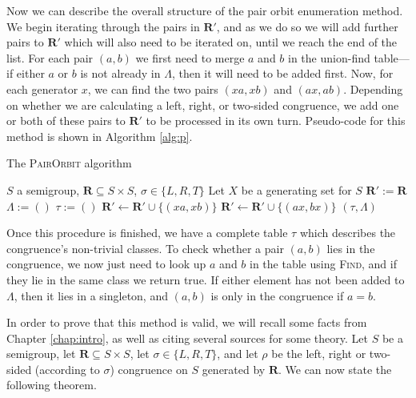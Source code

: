 Now we can describe the overall structure of the pair orbit enumeration method.
We begin iterating through the pairs in $\mathbf{R}'$, and as we do so we
will add further pairs to $\mathbf{R}'$ which will also need to be iterated on,
until we reach the end of the list.  For each pair $(a,b)$ we first need to
merge $a$ and $b$ in the union-find table---if either $a$ or $b$ is not
already in $\Lambda$, then it will need to be added first.  Now,
for each generator $x$, we can find the two pairs $(xa,xb)$ and $(ax,ab)$.
Depending on whether we are calculating a left, right, or two-sided congruence,
we add one or both of these pairs to $\mathbf{R}'$ to be processed in its own
turn.  Pseudo-code for this method is shown in Algorithm \ref{alg:p}.

\begin{algorithm}
\caption{The \textsc{PairOrbit} algorithm}
\label{alg:p}
\begin{algorithmic}[1]
\Require $S$ a semigroup,
         $\mathbf{R} \subseteq S \times S$,
         $\sigma \in \{L, R, T\}$
\State Let $X$ be a generating set for $S$
\State $\mathbf{R}' := \mathbf{R}$
\State $\Lambda := ()$ 
\State $\tau := ()$ 
    \State {}
  \EndIf
    \State {}
  \EndIf
  \State {}
      \State $\mathbf{R}' \gets \mathbf{R}' \cup \{(xa, xb)\}$
    \EndIf
      \State $\mathbf{R}' \gets \mathbf{R}' \cup \{(ax, bx)\}$
    \EndIf
  \EndFor
\EndFor
\State \Return $(\tau, \Lambda)$
\EndProcedure
\end{algorithmic}
\end{algorithm}

Once this procedure is finished, we have a complete table $\tau$ which describes
the congruence's non-trivial classes.  To check whether a pair $(a,b)$ lies in
the congruence, we now just need to look up $a$ and $b$ in the table using
\textsc{Find}, and if they lie in the same class we return true.  If either
element has not been added to $\Lambda$, then it lies in a singleton, and $(a,b)$
is only in the congruence if $a=b$.

In order to prove that this method is valid, we will recall some facts from
Chapter \ref{chap:intro}, as well as citing several sources for some theory.
Let $S$ be a semigroup, let $\mathbf{R} \subseteq S \times S$, let
$\sigma \in \{L, R, T\}$, and let $\rho$ be the left, right or two-sided
(according to $\sigma$) congruence on $S$ generated by $\mathbf{R}$.  We can now
state the following theorem.

